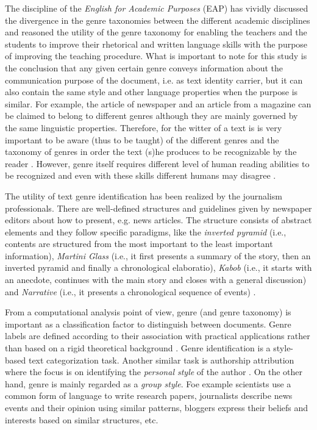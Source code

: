The discipline of the \textit{English for Academic Purposes} (EAP) has vividly discussed the divergence in the genre taxonomies between the different academic disciplines and reasoned the utility of the genre taxonomy for enabling the teachers and the students to improve their rhetorical and written language skills with the purpose of improving the teaching procedure. What is important to note for this study is the conclusion that any given certain genre conveys information about the communication purpose of the document, i.e. as text identity carrier, but it can also contain the same style and other language properties when the purpose is similar. For example, the article of newspaper and an article from a magazine can be claimed to belong to different genres although they are mainly governed by the same linguistic properties. Therefore, for the witter of a text is is very important to be aware (thus to be taught) of the different genres and the taxonomy of genres in order the text (s)he produces to be recognizable by the reader \parencite{hardy2016genre,melissourgou2017genre,al2017genre}. However, genre itself requires different level of human reading abilities to be recognized and even with these skills different humans may disagree \parencite{mccarthy2009psychological}.

The utility of text genre identification has been realized by the journalism professionals. There are well-defined structures and guidelines given by newspaper editors about how to present, e.g. news articles. The structure consists of abstract elements and they follow specific paradigms, like the \textit{inverted pyramid} (i.e., contents are structured from the most important to the least important information), \textit{Martini Glass} (i.e., it first presents a summary of the story, then an inverted pyramid and finally a chronological elaboratio), \textit{Kabob} (i.e., it starts with an anecdote, continues with the main story and closes with a general discussion) and \textit{Narrative} (i.e., it presents a chronological sequence of events) \parencite{dai2018fine}.

From a computational analysis point of view, genre (and genre taxonomy) is important as a classification factor to distinguish between documents. Genre labels are defined according to their association with practical applications rather than based on a rigid theoretical background \parencite{kanaris2009learning,santini2007automatic}. Genre identification is a style-based text categorization task. Another similar task is authorship attribution where the focus is on identifying the \textit{personal style} of the author \parencite{stamatatos2009survey,koppel2011authorship,koppel2014determining}. On the other hand, genre is mainly regarded as a \textit{group style}. Foe example scientists use a common form of language to write research papers, journalists describe news events and their opinion using similar patterns, bloggers express their beliefs and interests based on similar structures, etc.

